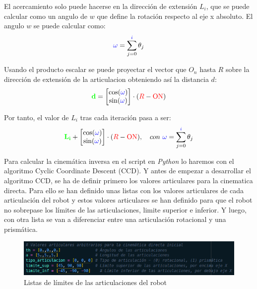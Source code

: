 \documentclass[11pt]{report}
\begin{document}
El acercamiento solo puede hacerse en la dirección de extensión $L_i$, que se puede calcular como un angulo de $w$ que define
la rotación respecto al eje x absoluto. El angulo $w$ se puede calcular como:
\begin{equation*}
  \color{blue}\omega\color{black} = \sum_{j = 0}^{\color{blue}i\color{black}} \theta_j
\end{equation*}

Usando el producto escalar se puede proyectar el vector que $O_n$ hasta $R$ sobre la dirección de extensión de la articulacion
obteniendo así la distancia $d$:
\begin{equation*}
  \color{green} \mathbf{d} \color{black} =
  \begin{bmatrix}
    \cos(\color{blue}\omega\color{black}) \\
    \sin(\color{blue}\omega\color{black})
  \end{bmatrix}
  \cdot (\color{red}R\color{black}- \color{red}\text{ON}\color{black})
\end{equation*}

Por tanto, el valor de $L_i$ tras cada iteración pasa a ser:
\begin{equation*}
  \color{green} \mathbf{L_i} \color{black} +
  \begin{bmatrix}
    \cos(\color{blue}\omega\color{black}) \\
    \sin(\color{blue}\omega\color{black})
  \end{bmatrix}
  \cdot (\color{red}R\color{black}- \color{red}\text{ON}\color{black}),\ \ \ con \ 
  \color{blue}\omega\color{black} = \sum_{j = 0}^{\color{blue}i\color{black}} \theta_j
\end{equation*}

Para calcular la cinemática inversa en el script en \emph{Python} lo haremos con el algoritmo Cyclic Coordinate Descent (CCD).
Y antes de empezar a desarrollar el algoritmo CCD, se ha de definir primero los valores articulares para la cinematica directa.
Para ello se han definido unas listas con los valores articulares de cada articulación del robot y estos valores articulares
se han definido para que el robot no sobrepase los límites de las articulaciones, limite superior e inferior. Y luego, con 
otra lista se van a diferenciar entre una articulación rotacional y una prismática.

\begin{figure}[H]
  \centering
  \includegraphics[scale=0.7]{img/listas_ci.png}
  \caption{Listas de límites de las articulaciones del robot}
\end{figure}
\end{document}
